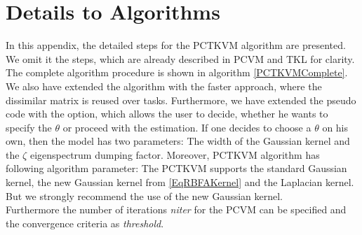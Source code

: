 \chapter{Details to Algorithms}\label{appac}
In this appendix, the detailed steps for the \acs{PCTKVM} algorithm are presented.
We omit it the steps, which are already described in \acs{PCVM} and \acs{TKL} for clarity.
The complete algorithm procedure is shown in algorithm \ref{PCTKVMComplete}.\\
We also have extended the algorithm with the faster approach, where the dissimilar matrix is reused over tasks.
Furthermore, we have extended the pseudo code with the option, which allows the user to decide, whether he wants to specify the $\theta$ or proceed with the estimation.
If one decides to choose a $\theta$ on his own, then the model has two parameters: The width of the Gaussian kernel and the $\zeta$ eigenspectrum dumping factor.
Moreover, \acs{PCTKVM} algorithm has following algorithm parameter:
The \acs{PCTKVM} supports the standard Gaussian kernel, the new Gaussian kernel from \eqref{EqRBFAKernel} and the Laplacian kernel. But we strongly recommend the use of the new Gaussian kernel.\\
Furthermore the number of iterations \textit{niter} for the \acs{PCVM} can be specified and the convergence criteria as \textit{threshold}.

